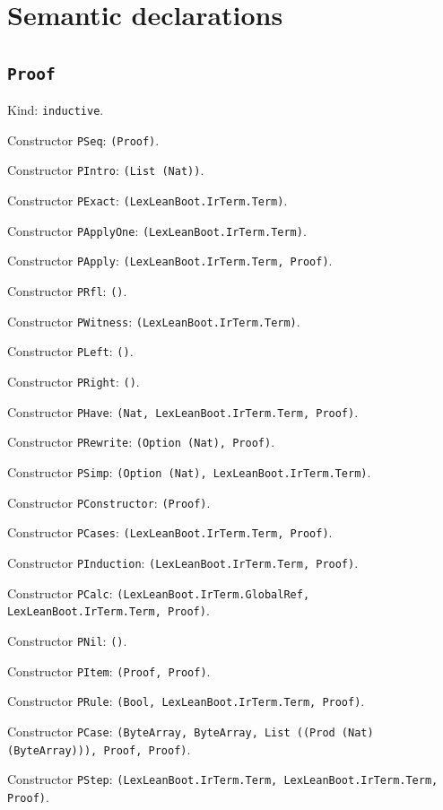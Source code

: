 \documentclass[11pt]{article}
\begin{document}
\section*{Semantic declarations}
\subsection*{\texttt{Proof}}
\noindent Kind: \texttt{inductive}.\par
\noindent Constructor \texttt{PSeq}: \texttt{(Proof)}.\par
\noindent Constructor \texttt{PIntro}: \texttt{(List (Nat))}.\par
\noindent Constructor \texttt{PExact}: \texttt{(LexLeanBoot.IrTerm.Term)}.\par
\noindent Constructor \texttt{PApplyOne}: \texttt{(LexLeanBoot.IrTerm.Term)}.\par
\noindent Constructor \texttt{PApply}: \texttt{(LexLeanBoot.IrTerm.Term, Proof)}.\par
\noindent Constructor \texttt{PRfl}: \texttt{()}.\par
\noindent Constructor \texttt{PWitness}: \texttt{(LexLeanBoot.IrTerm.Term)}.\par
\noindent Constructor \texttt{PLeft}: \texttt{()}.\par
\noindent Constructor \texttt{PRight}: \texttt{()}.\par
\noindent Constructor \texttt{PHave}: \texttt{(Nat, LexLeanBoot.IrTerm.Term, Proof)}.\par
\noindent Constructor \texttt{PRewrite}: \texttt{(Option (Nat), Proof)}.\par
\noindent Constructor \texttt{PSimp}: \texttt{(Option (Nat), LexLeanBoot.IrTerm.Term)}.\par
\noindent Constructor \texttt{PConstructor}: \texttt{(Proof)}.\par
\noindent Constructor \texttt{PCases}: \texttt{(LexLeanBoot.IrTerm.Term, Proof)}.\par
\noindent Constructor \texttt{PInduction}: \texttt{(LexLeanBoot.IrTerm.Term, Proof)}.\par
\noindent Constructor \texttt{PCalc}: \texttt{(LexLeanBoot.IrTerm.GlobalRef, LexLeanBoot.IrTerm.Term, Proof)}.\par
\noindent Constructor \texttt{PNil}: \texttt{()}.\par
\noindent Constructor \texttt{PItem}: \texttt{(Proof, Proof)}.\par
\noindent Constructor \texttt{PRule}: \texttt{(Bool, LexLeanBoot.IrTerm.Term, Proof)}.\par
\noindent Constructor \texttt{PCase}: \texttt{(ByteArray, ByteArray, List ((Prod (Nat) (ByteArray))), Proof, Proof)}.\par
\noindent Constructor \texttt{PStep}: \texttt{(LexLeanBoot.IrTerm.Term, LexLeanBoot.IrTerm.Term, Proof)}.\par
\end{document}
